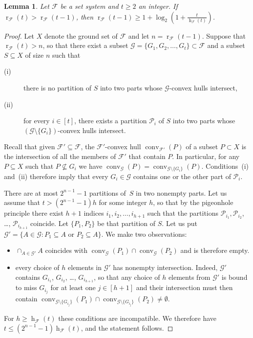 \documentclass[a4paper,UKenglish,thm-restate]{article}
\newcommand{\p}{\mathcal{P}}
\newcommand{\F}{\mathcal{F}}
\newcommand{\G}{\mathcal{G}}
\DeclareMathOperator{\h}{h}
\DeclareMathOperator{\conv}{conv}
\DeclareMathOperator{\rad}{r}
\newcommand{\pth}[1]{\left(#1\right)}
\newtheorem{lemma}{Lemma}[section]
\begin{document}
\begin{lemma}\label{l:radongrowth}
  Let $\F$ be a set system and $t\ge 2$ an integer. If $\rad_\F(t) > \rad_\F(t-1)$, then $\rad_\F(t-1) \ge 1+\log_2\pth{1+\frac{t}{\h_\F(t)}}$.%
\end{lemma}
\begin{proof}
  Let $X$ denote the ground set of $\F$ and let $n = \rad_\F(t-1)$. Suppose that $\rad_\F(t)>n$, so that there exist a subset $\G = \{G_1,G_2, \ldots, G_t\} \subset \F$ and a subset $S \subseteq X$ of size $n$ such that

\begin{description}
\item[(i)] there is no partition of $S$ into two parts whose $\G$-convex hulls intersect,\medskip
\item[(ii)] for every $i \in [t]$, there exists a partition $\p_i$ of $S$ into two parts whose $(\G\setminus \{G_i\})$-convex hulls intersect.
\end{description}

\noindent
Recall that given $\F' \subseteq \F$, the $\F'$-convex hull $\conv_{\F'}(P)$ of a subset $P\subset X$ is the intersection of all the members of $\F'$ that contain $P$. In particular, for any $P \subseteq X$ such that $P \not \subseteq G_{i}$ we have $\conv_\G(P) = \conv_{\G\setminus \{G_{i}\}}(P)$. Conditions~(i) and~(ii) therefore imply that every $G_i \in \G$ contains one or the other part of $\p_i$.

\medskip

There are at most $2^{n-1}-1$ partitions of~$S$ in two nonempty parts. Let us assume that $t > (2^{n-1}-1)h$ for some integer $h$, so that by the pigeonhole principle there exist $h+1$ indices $i_1,i_2, \ldots, i_{h+1}$ such that the partitions $\p_{i_1}, \p_{i_2}$, \ldots, $\p_{i_{h+1}}$ coincide. Let $\{P_1,P_2\}$ be that partition of $S$. Let us put $\G' = \{ A \in \G \colon P_1 \subseteq A \text{ or } P_2 \subseteq A\}$. We make two observations:

\begin{itemize}
\item $\cap_{A \in \G'}A$ coincides with $\conv_{\G}(P_1) \cap \conv_{\G}(P_2)$ and is therefore empty.\medskip
\item every choice of $h$ elements in $\G'$ has nonempty intersection. Indeed, $\G'$ contains $G_{i_1}$, $G_{i_2}$, \ldots, $G_{i_{h+1}}$, so that any choice of $h$ elements from $\G'$ is bound to miss $G_{i_j}$ for at least one $j \in [h+1]$ and their intersection must then contain $\conv_{\G \setminus \{G_{i_j}\}}(P_1) \cap \conv_{\G \setminus \{G_{i_j}\}}(P_2) \neq \emptyset$. 
\end{itemize}

\noindent
For $h \ge \h_\F(t)$ these conditions are incompatible. We therefore have $t \le (2^{n-1}-1) \h_\F(t)$, and the statement follows.
\end{proof}
\end{document}
